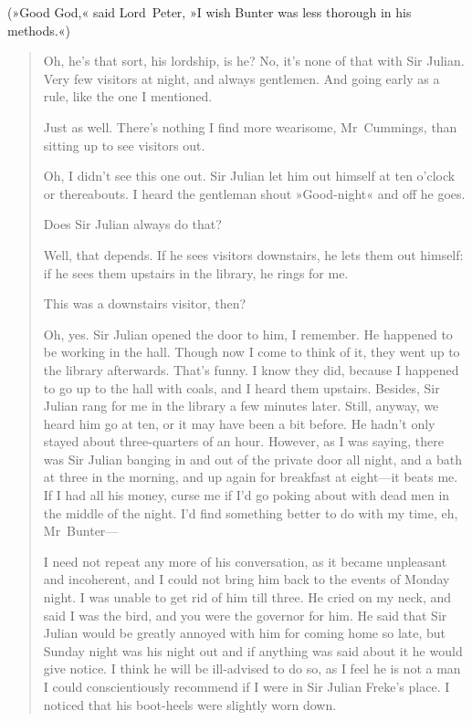 (»Good God,« said Lord~Peter, »I wish Bunter was less thorough in his methods.«)

\begin{quotation}
\begin{dialogue}
 Oh, he's that sort, his lordship, is he?  No, it's none of that with Sir Julian. Very few visitors at night, and always gentlemen. And going early as a rule, like the one I mentioned.

 Just as well. There's nothing I find more wearisome, Mr~Cummings, than sitting up to see visitors out.

 Oh, I didn't see this one out. Sir Julian let him out himself at ten o'clock or thereabouts. I heard the gentleman shout »Good-night« and off he goes.

 Does Sir Julian always do that?

 Well, that depends. If he sees visitors downstairs, he lets them out himself: if he sees them upstairs in the library, he rings for me.

 This was a downstairs visitor, then?

 Oh, yes. Sir Julian opened the door to him, I remember. He happened to be working in the hall. Though now I come to think of it, they went up to the library afterwards. That's funny. I know they did, because I happened to go up to the hall with coals, and I heard them upstairs. Besides, Sir Julian rang for me in the library a few minutes later. Still, anyway, we heard him go at ten, or it may have been a bit before. He hadn't only stayed about three-quarters of an hour. However, as I was saying, there was Sir Julian banging in and out of the private door all night, and a bath at three in the morning, and up again for breakfast at eight—it beats me. If I had all his money, curse me if I'd go poking about with dead men in the middle of the night. I'd find something better to do with my time, eh, Mr~Bunter—

\end{dialogue}

I need not repeat any more of his conversation, as it became unpleasant and incoherent, and I could not bring him back to the events of Monday night. I was unable to get rid of him till three. He cried on my neck, and said I was the bird, and you were the governor for him. He said that Sir Julian would be greatly annoyed with him for coming home so late, but Sunday night was his night out and if anything was said about it he would give notice. I think he will be ill-advised to do so, as I feel he is not a man I could conscientiously recommend if I were in Sir Julian Freke's place. I noticed that his boot-heels were slightly worn down.


\end{quotation}
